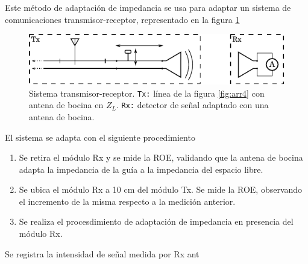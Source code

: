 \documentclass[11pt,a4paper]{article}
\begin{document}
\begin{multicols}{2}
Este método de adaptación de impedancia se usa para adaptar un sistema de comunicaciones transmisor-receptor, representado en la figura \ref{fig:sistema}

\begin{figure}[H]
    \centering
    \includegraphics[width=\linewidth]{Images/sistema.pdf}
    \caption{Sistema transmisor-receptor.
    \texttt{Tx:} línea de la figura \ref{fig:arr4} con antena de bocina en $Z_L$. 
    \texttt{Rx:} detector de señal adaptado con una antena de bocina.}
    \label{fig:sistema}
\end{figure}

El sistema se adapta con el siguiente procedimiento
\begin{enumerate}
    \item Se retira el módulo Rx y se mide la ROE, validando que la antena de bocina adapta la impedancia de la guía a la impedancia del espacio libre.
    \item Se ubica el módulo Rx a 10 cm del módulo Tx. Se mide la ROE, observando el incremento de la misma respecto a la medición anterior.
    \item Se realiza el procesdimiento de adaptación de impedancia en presencia del módulo Rx.
\end{enumerate}

Se registra la intensidad de señal medida por Rx ant


\end{multicols}
\end{document}

